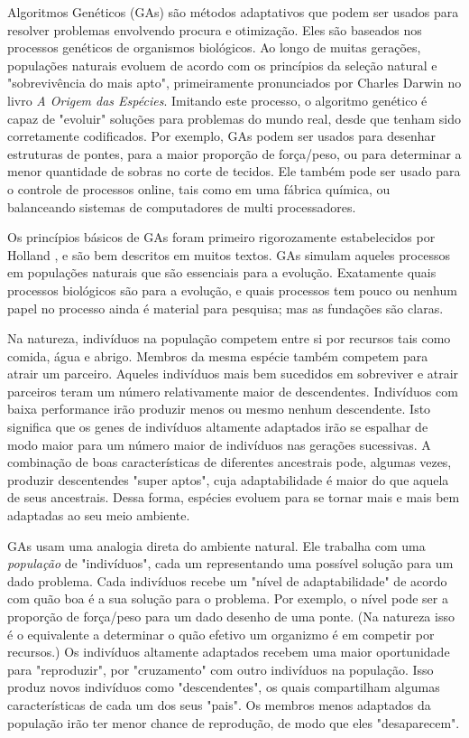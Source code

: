 Algoritmos Genéticos (GAs) são métodos adaptativos que podem ser usados para resolver problemas envolvendo procura e otimização. Eles são baseados nos processos genéticos de organismos biológicos. Ao longo de muitas gerações, populações naturais evoluem de acordo com os princípios da seleção natural e "sobrevivência do mais apto", primeiramente pronunciados por Charles Darwin no livro \textit{A Origem das Espécies}. Imitando este processo, o algoritmo genético é capaz de "evoluir" soluções para problemas do mundo real, desde que tenham sido corretamente codificados. Por exemplo, GAs podem ser usados para desenhar estruturas de pontes, para a maior proporção de força/peso, ou para determinar a menor quantidade de sobras no corte de tecidos. Ele também pode ser usado para o controle de processos online, tais como em uma fábrica química, ou balanceando sistemas de computadores de multi processadores. \cite{Beasley1993}

Os princípios básicos de GAs foram primeiro rigorozamente estabelecidos por Holland \cite{Holland1992}, e são bem descritos em muitos textos. GAs simulam aqueles processos em populações naturais que são essenciais para a evolução. Exatamente quais processos biológicos são  para a evolução, e quais processos tem pouco ou nenhum papel no processo ainda é material para pesquisa; mas as fundações são claras.

Na natureza, indivíduos na população competem entre si por recursos tais como comida, água e abrigo. Membros da mesma espécie também competem para atrair um parceiro. Aqueles indivíduos mais bem sucedidos em sobreviver e atrair parceiros teram um número relativamente maior de descendentes. Indivíduos com baixa performance irão produzir menos ou mesmo nenhum descendente. Isto significa que os genes de indivíduos altamente adaptados irão se espalhar de modo maior para um número maior de indivíduos nas gerações sucessivas. A combinação de boas características de diferentes ancestrais pode, algumas vezes, produzir descentendes "super aptos", cuja adaptabilidade é maior do que aquela de seus ancestrais. Dessa forma, espécies evoluem para se tornar mais e mais bem adaptadas ao seu meio ambiente. \cite{Beasley1993}

GAs usam uma analogia direta do ambiente natural. Ele trabalha com uma \textit{população} de "indivíduos", cada um representando uma possível solução para um dado problema. Cada indivíduos recebe um "nível de adaptabilidade" de acordo com quão boa é a sua solução para o problema. Por exemplo, o nível pode ser a proporção de força/peso para um dado desenho de uma ponte. (Na natureza isso é o equivalente a determinar o quão efetivo um organizmo é em competir por recursos.) Os indivíduos altamente adaptados recebem uma maior oportunidade para "reproduzir", por "cruzamento" com outro indivíduos na população. Isso produz novos indivíduos como "descendentes", os quais compartilham algumas características de cada um dos seus "pais". Os membros menos adaptados da população irão ter menor chance de reprodução, de modo que eles "desaparecem".

